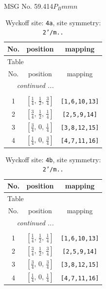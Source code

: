 \documentclass[fleqn,8pt]{jsarticle}
\begin{document}
\setcounter{MaxMatrixCols}{32}

\renewcommand{\tablename}{Table~}
\renewcommand{\figurename}{Figure~}
\begin{center}
\LARGE
MSG No. 59.414\quad$P_{B}mmn$
\end{center}
\renewcommand{\arraystretch}{1.2}
\begin{longtable}{ccc}
\caption{Wyckoff site: {\tt 4a}, site symmetry: {\tt 2'/m..}}
 \\
 \hline \hline
No. & position & mapping \\ \hline \endfirsthead

\multicolumn{2}{l}{\tablename\ \thetable{}} \\
 \hline \hline
No. & position & mapping \\ \hline \endhead

 \hline \hline
\multicolumn{2}{r}{\footnotesize\it continued ...} \\ \endfoot

 \hline \hline
\multicolumn{2}{r}{} \\ \endlastfoot

1 & $\left[ \frac{1}{4},\, \frac{1}{2},\, \frac{3}{4} \right]$ & {\tt [1,6,10,13]} \\ \hline
2 & $\left[ \frac{3}{4},\, \frac{1}{2},\, \frac{1}{4} \right]$ & {\tt [2,5,9,14]} \\ \hline
3 & $\left[ \frac{3}{4},\, 0,\, \frac{1}{4} \right]$ & {\tt [3,8,12,15]} \\ \hline
4 & $\left[ \frac{1}{4},\, 0,\, \frac{3}{4} \right]$ & {\tt [4,7,11,16]} \\
\end{longtable}
\renewcommand{\arraystretch}{1.2}
\begin{longtable}{ccc}
\caption{Wyckoff site: {\tt 4b}, site symmetry: {\tt 2'/m..}}
 \\
 \hline \hline
No. & position & mapping \\ \hline \endfirsthead

\multicolumn{2}{l}{\tablename\ \thetable{}} \\
 \hline \hline
No. & position & mapping \\ \hline \endhead

 \hline \hline
\multicolumn{2}{r}{\footnotesize\it continued ...} \\ \endfoot

 \hline \hline
\multicolumn{2}{r}{} \\ \endlastfoot

1 & $\left[ \frac{1}{4},\, \frac{1}{2},\, \frac{1}{4} \right]$ & {\tt [1,6,10,13]} \\ \hline
2 & $\left[ \frac{3}{4},\, \frac{1}{2},\, \frac{3}{4} \right]$ & {\tt [2,5,9,14]} \\ \hline
3 & $\left[ \frac{3}{4},\, 0,\, \frac{3}{4} \right]$ & {\tt [3,8,12,15]} \\ \hline
4 & $\left[ \frac{1}{4},\, 0,\, \frac{1}{4} \right]$ & {\tt [4,7,11,16]} \\
\end{longtable}
\end{document}
